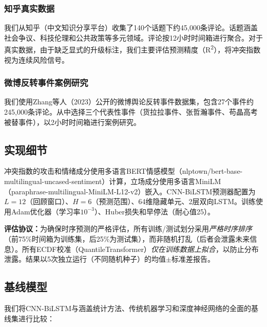 \documentclass[conference]{IEEEtran}
\begin{document}
\subsubsection{知乎真实数据}

我们从知乎（中文知识分享平台）收集了140个话题下约45,000条评论。话题涵盖社会争议、科技伦理和公共政策等多元领域。评论按12小时时间箱进行聚合。对于真实数据，由于缺乏显式的升级标注，我们主要评估预测精度（R\textsuperscript{2}），将冲突指数视为连续风险信号。

\subsubsection{微博反转事件案例研究}

我们使用Zhang等人（2023）公开的微博舆论反转事件数据集，包含27个事件约245,000条评论。从中选择三个代表性事件（货拉拉事件、张哲瀚事件、苟晶高考被替事件），以2小时时间箱进行案例研究。

\subsection{实现细节}

冲突指数的攻击和情绪成分使用多语言BERT情感模型（nlptown/bert-base-multilingual-uncased-sentiment）计算，立场成分使用多语言MiniLM（paraphrase-multilingual-MiniLM-L12-v2）嵌入。CNN-BiLSTM预测器配置为$L{=}12$（回顾窗口）、$H{=}6$（预测范围）、64维隐藏单元、2层双向LSTM。训练使用Adam优化器（学习率$10^{-3}$）、Huber损失和早停法（耐心值25）。

\textbf{评估协议：}为确保时序预测的严格评估，所有训练/测试划分采用\emph{严格时序排序}（前75\%时间箱为训练集，后25\%为测试集），而非随机打乱（后者会泄露未来信息）。所有ECDF校准（QuantileTransformer）\emph{仅在训练数据上拟合}，以防止分布泄露。结果以5次独立运行（不同随机种子）的均值$\pm$标准差报告。

\subsection{基线模型}

我们将CNN-BiLSTM与涵盖统计方法、传统机器学习和深度神经网络的全面的基线集进行比较：
\end{document}
